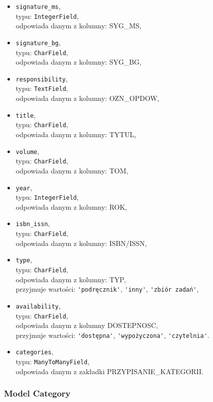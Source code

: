 \documentclass[twoside]{projektInzynierskiMS}
\begin{document}
\begin{itemize}
	\item \verb`signature_ms`, \\
		typu: \verb`IntegerField`, \\
		odpowiada danym z kolumny: SYG\_MS,
	\item \verb`signature_bg`, \\
		typu: \verb`CharField`, \\
		odpowiada danym z kolumny: SYG\_BG,
	\item \verb`responsibility`, \\
		typu: \verb`TextField`, \\
		odpowiada danym z kolumny: OZN\_OPDOW,
	\item \verb`title`, \\
		typu: \verb`CharField`, \\
		odpowiada danym z kolumny: TYTUL,
	\item \verb`volume`, \\
		typu: \verb`CharField`, \\
		odpowiada danym z kolumny: TOM,
	\item \verb`year`,\\
		typu: \verb`IntegerField`, \\
		odpowiada danym z kolumny: ROK,
	\item \verb`isbn_issn`, \\
		typu: \verb`CharField`, \\
		odpowiada danym z kolumny: ISBN/ISSN,
	\item \verb`type`, \\
		typu: \verb`CharField`, \\
		odpowiada danym z kolumny: TYP, \\
		przyjmuje wartości: \verb`'podręcznik'`, \verb`'inny'`, \verb`'zbiór zadań'`,
	\item \verb`availability`, \\
		typu: \verb`CharField`, \\
		odpowiada danym z kolumny DOSTEPNOSC, \\
		przyjmuje wartości: \verb`'dostępna'`, \verb`'wypożyczona'`, \verb`'czytelnia'`.
	\item \verb`categories`, \\
		typu: \verb`ManyToManyField`, \\
		odpowiada danym z zakładki PRZYPISANIE\_KATEGORII.
\end{itemize}

\subsubsection{Model Category}
\end{document}
